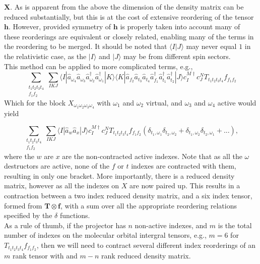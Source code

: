 \documentclass[12pt]{article}
\begin{document}
$\mathbf{X}$. As is apparent from the above the dimension of the density matrix
can be reduced substantially, but this is at the cost of extensive reordering
of the tensor $\mathbf{h}$. However, provided symmetry of $\mathbf{h}$ is
properly taken into account many of these reorderings are equivalent or closely
related, enabling many of the terms in the reordering to be merged. It should
be noted that $\langle I | J \rangle $ may never equal $1$ in the relativistic
case, as the $ | I\rangle $ and $| J \rangle $ may be from different spin
sectors.\\ 

\noindent This method can be applied to more complicated terms, e.g.,
\begin{equation}
\sum_{ \substack{t_{1}t_{2}t_{3}t_{4}\\ f_{1}f_{2}}} 
\sum_{IKJ}
\langle I |
\hat{a}_{\omega_{4}} \hat{a}_{\omega_{3}}\hat{a}^{\dagger}_{\omega_{2}}\hat{a}^{\dagger}_{\omega_{1}}
| K \rangle \langle K | 
\hat{a}_{f_{2}}\hat{a}_{t_{3}}\hat{a}_{t_{4}}\hat{a}^{\dagger}_{f_{1}}\hat{a}^{\dagger}_{t_{1}} \hat{a}^{\dagger}_{t_{2}}| J \rangle  
c^{M \dagger}_{I}c^{N}_{J} T_{t_{1}t_{2}t_{3}t_{4}}f_{f_{1}f_{2}}
\label{eqn:X_RI_fT_anti_normal1}
\end{equation}
Which for the block $X_{\omega_{1}\omega_{2}\omega_{3}\omega_{4}}$ with 
$\omega_{1}$ and $\omega_{2}$ virtual, and $\omega_{3}$ and $\omega_{4}$ active would yield 

\begin{equation}
\sum_{ \substack{t_{1}t_{2}t_{3}t_{4}\\ f_{1}f_{2}}} 
\sum_{IKJ}
\langle I | \hat{a}_{w}\hat{a}_{x}| J \rangle  
c^{M \dagger}_{I}c^{N}_{J} T_{t_{1}t_{2}t_{3}t_{4}}f_{f_{1}f_{2}}
( \delta_{t_{1},\omega_{1}}\delta_{t_{2},\omega_{2}} +  \delta_{t_{1},\omega_{2}}\delta_{t_{2},\omega_{1}} + ... ),
\label{eqn:XfTend}
\end{equation}
\noindent where the $w$ are $x$  are the non-contracted active indexes.
Note that as all the $\omega$ destructors are active, none of the $f$ or $t$ indexes are contracted with them,
resulting in only one bracket. More importantly, there is a reduced density matrix, however as all the indexes on
$X$ are now paired up. This results in a contraction between a two index reduced density matrix, and a six index
tensor, formed from $\mathbf{T}\otimes\mathbf{f}$, with a sum over all the appropriate reordering relations 
specified by the $\delta$ functions. \\ 

\noindent As a rule of thumb, if the projector has $n$ non-active indexes, and $m$ is the total number of indexes on the molecular orbital intergral tensors, e.g.,
$m=6$ for $T_{t_{1}t_{2}t_{3}t_{4}}f_{f_{1}f_{2}}$, then we will need to contract several different index reorderings of an $m$ rank tensor with and $m-n$ rank reduced density matrix. 
\end{document}
